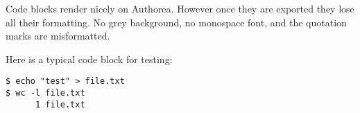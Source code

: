 
Code blocks render nicely on Authorea.
However once they are exported they lose all their formatting.
No grey background, no monospace font, and the quotation marks are misformatted.

Here is a typical code block for testing:

\begin{lstlisting}
$ echo "test" > file.txt
$ wc -l file.txt
      1 file.txt
\end{lstlisting}


  
